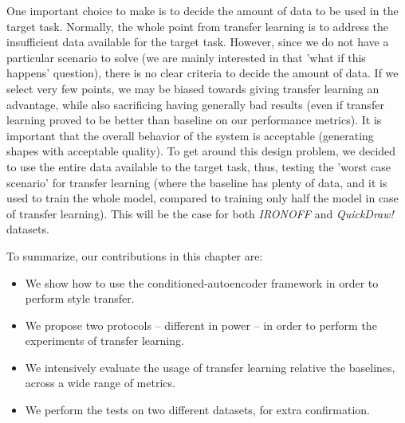   \par One important choice to make is to decide the amount of data to be used in the target task. Normally, the whole point from transfer learning is to address the insufficient data available for the target task. However, since we do not have a particular scenario to solve (we are mainly interested in that 'what if this happens' question), there is no clear criteria to decide the amount of data. If we select very few points, we may be biased towards giving transfer learning an advantage, while also sacrificing having generally bad results (even if transfer learning proved to be better than baseline on our performance metrics). It is important that the overall behavior of the system is acceptable (generating shapes with acceptable quality). To get around this design problem, we decided to use the entire data available to the target task, thus, testing the 'worst case scenario' for transfer learning (where the baseline has plenty of data, and it is used to train the whole model, compared to training only half the model in case of transfer learning). This will be the case for both \textit{IRONOFF} and \textit{QuickDraw!} datasets.

  \par To summarize, our contributions in this chapter are:
  \begin{itemize}
    \item We show how to use the conditioned-autoencoder framework in order to perform style transfer.
    \item We propose two protocols -- different in power -- in order to perform the experiments of transfer learning.
    \item We intensively evaluate the usage of transfer learning relative the baselines, across a wide range of metrics.
    \item We perform the tests on two different datasets, for extra confirmation.
  \end{itemize}

